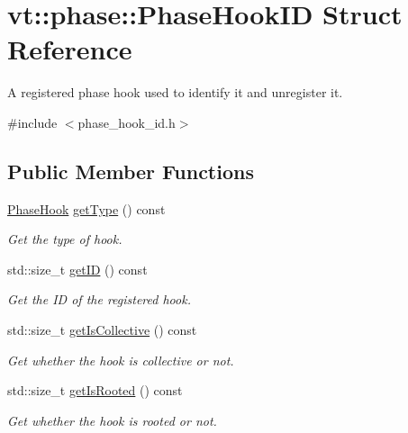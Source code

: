 \hypertarget{structvt_1_1phase_1_1_phase_hook_i_d}{}\section{vt\+:\+:phase\+:\+:Phase\+Hook\+ID Struct Reference}
\label{structvt_1_1phase_1_1_phase_hook_i_d}


A registered phase hook used to identify it and unregister it.  




{\ttfamily \#include $<$phase\+\_\+hook\+\_\+id.\+h$>$}

\subsection*{Public Member Functions}
\begin{DoxyCompactItemize}
\item 
\hyperlink{namespacevt_1_1phase_aec9a63fdd99680d7a7fe99d321193811}{Phase\+Hook} \hyperlink{structvt_1_1phase_1_1_phase_hook_i_d_a2174260d92495e701ce0636e62b25004}{get\+Type} () const
\begin{DoxyCompactList}\small\item\em Get the type of hook. \end{DoxyCompactList}\item 
std\+::size\+\_\+t \hyperlink{structvt_1_1phase_1_1_phase_hook_i_d_ad00ab1e7e2854b3463b39e96ab149a13}{get\+ID} () const
\begin{DoxyCompactList}\small\item\em Get the ID of the registered hook. \end{DoxyCompactList}\item 
std\+::size\+\_\+t \hyperlink{structvt_1_1phase_1_1_phase_hook_i_d_ad3f0edab6498385a2611f41f7a658ffa}{get\+Is\+Collective} () const
\begin{DoxyCompactList}\small\item\em Get whether the hook is collective or not. \end{DoxyCompactList}\item 
std\+::size\+\_\+t \hyperlink{structvt_1_1phase_1_1_phase_hook_i_d_a0084724ed8635e3307198227d7055a9a}{get\+Is\+Rooted} () const
\begin{DoxyCompactList}\small\item\em Get whether the hook is rooted or not. \end{DoxyCompactList}\end{DoxyCompactItemize}

